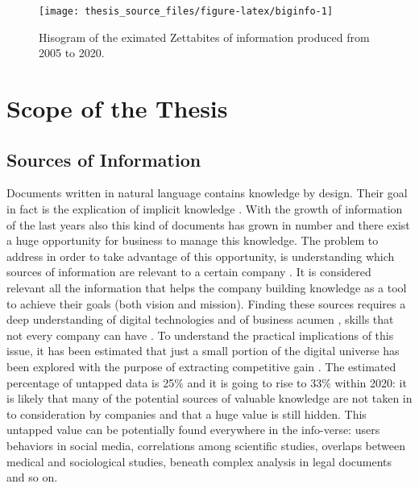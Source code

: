\documentclass[b5paper,]{book}
\theoremstyle{definition}
\theoremstyle{definition}
\theoremstyle{definition}
\theoremstyle{remark}
\begin{document}
\begin{figure}

{\centering \texttt{[image: thesis\_source\_files/figure-latex/biginfo-1]} 

}

\caption{Hisogram of the eximated Zettabites of information produced from 2005 to 2020.}\label{fig:biginfo}
\end{figure}

\chapter{Scope of the Thesis}\label{scope-of-the-thesis}

\section{Sources of Information}\label{sources-of-information}

Documents written in natural language contains knowledge by design.
Their goal in fact is the explication of implicit knowledge
\citep[\citet{graesser1985structures}]{masters1992knowledge}. With the
growth of information of the last years also this kind of documents has
grown in number and there exist a huge opportunity for business to
manage this knowledge. The problem to address in order to take advantage
of this opportunity, is understanding which sources of information are
relevant to a certain company
\citep{larose2014discovering, chemchem2015data, kasemsap2015role}. It is
considered relevant all the information that helps the company building
knowledge as a tool to achieve their goals (both vision and mission).
Finding these sources requires a deep understanding of digital
technologies and of business acumen , skills that not every company can
have
\citep{hecklau2016holistic, davenport2012data, provost2013data, van2014data}.
To understand the practical implications of this issue, it has been
estimated that just a small portion of the digital universe has been
explored with the purpose of extracting competitive gain
\citep{data2012bigger}. The estimated percentage of untapped data is
25\% and it is going to rise to 33\% within 2020: it is likely that many
of the potential sources of valuable knowledge are not taken in to
consideration by companies and that a huge value is still hidden. This
untapped value can be potentially found everywhere in the info-verse:
users behaviors in social media, correlations among scientific studies,
overlaps between medical and sociological studies, beneath complex
analysis in legal documents and so on.
\end{document}
